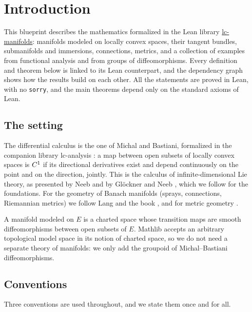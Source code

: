 \chapter{Introduction}
\label{chap:introduction}

This blueprint describes the mathematics formalized in the Lean library
\href{https://github.com/glaroton/lc-manifolds}{lc-manifolds}: manifolds modeled on locally convex
spaces, their tangent bundles, submanifolds and immersions, connections, metrics, and a collection
of examples from functional analysis and from groups of diffeomorphisms. Every definition and
theorem below is linked to its Lean counterpart, and the dependency graph shows how the results
build on each other. All the statements are proved in Lean, with no \texttt{sorry}, and the main
theorems depend only on the standard axioms of Lean.

\section*{The setting}

The differential calculus is the one of Michal and Bastiani, formalized in the companion library
lc-analysis \cite{LCA}: a map between open subsets of locally convex spaces is $C^{1}$ if its
directional derivatives exist and depend continuously on the point and on the direction, jointly.
This is the calculus of infinite-dimensional Lie theory, as presented by Neeb \cite{Nee06} and by
Glöckner and Neeb \cite{GN26}, which we follow for the foundations. For the geometry of Banach
manifolds (sprays, connections, Riemannian metrics) we follow Lang \cite{Lan99} and the book
\cite{Lar22}, and for metric geometry \cite{Lar19}.

A manifold modeled on $E$ is a charted space whose transition maps are smooth diffeomorphisms
between open subsets of $E$. Mathlib \cite{mC20} accepts an arbitrary topological model space in
its notion of charted space, so we do not need a separate theory of manifolds: we only add the
groupoid of Michal--Bastiani diffeomorphisms.

\section*{Conventions}

Three conventions are used throughout, and we state them once and for all.

